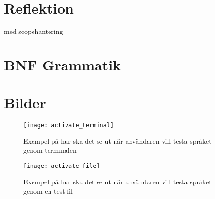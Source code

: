 \documentclass{TDP019mall}
\begin{document}
\section{Reflektion}
med scopehantering 




\section{BNF Grammatik}


\newpage
\section{Bilder}

\begin{figure}[h]
\caption{Exempel på hur ska det se ut när användaren vill testa språket genom terminalen}
\centering
\texttt{[image: activate\_terminal]}
\end{figure}

\begin{figure}[h]
\caption{Exempel på hur ska det se ut när användaren vill testa språket genom en test fil}
\centering
\texttt{[image: activate\_file]}
\end{figure}
\end{document}
